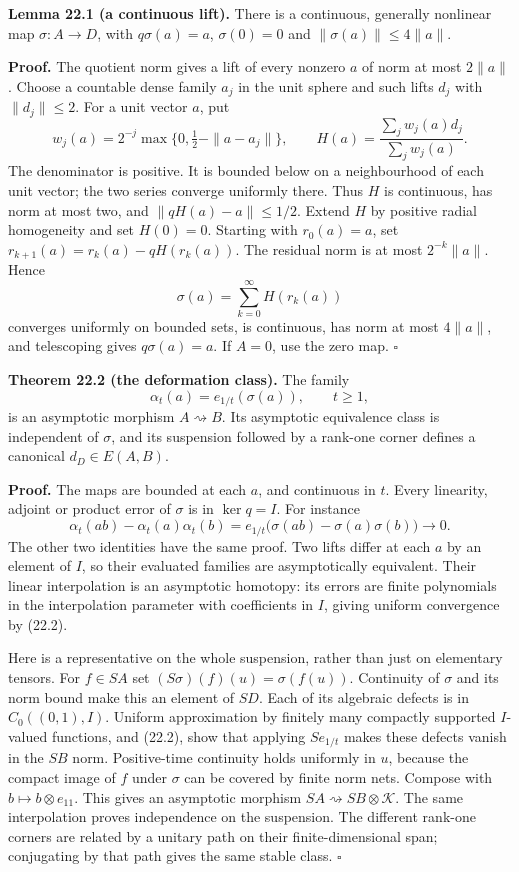 \documentclass[
  11pt,
]{article}
\begin{document}
\textbf{Lemma 22.1 (a continuous lift).} There is a continuous,
generally nonlinear map \(\sigma:A\to D\), with \(q\sigma(a)=a\),
\(\sigma(0)=0\) and \(\|\sigma(a)\|\leq4\|a\|\).

\textbf{Proof.} The quotient norm gives a lift of every nonzero \(a\) of
norm at most \(2\|a\|\). Choose a countable dense family \(a_j\) in the
unit sphere and such lifts \(d_j\) with \(\|d_j\|\leq2\). For a unit
vector \(a\), put \[
w_j(a)=2^{-j}\max\{0,\tfrac12-\|a-a_j\|\},\qquad
H(a)=\frac{\sum_jw_j(a)d_j}{\sum_jw_j(a)}.
\tag{22.3}
\] The denominator is positive. It is bounded below on a neighbourhood
of each unit vector; the two series converge uniformly there. Thus \(H\)
is continuous, has norm at most two, and \(\|qH(a)-a\|\leq1/2\). Extend
\(H\) by positive radial homogeneity and set \(H(0)=0\). Starting with
\(r_0(a)=a\), set \(r_{k+1}(a)=r_k(a)-qH(r_k(a))\). The residual norm is
at most \(2^{-k}\|a\|\). Hence \[
\sigma(a)=\sum_{k=0}^{\infty}H(r_k(a))
\tag{22.4}
\] converges uniformly on bounded sets, is continuous, has norm at most
\(4\|a\|\), and telescoping gives \(q\sigma(a)=a\). If \(A=0\), use the
zero map. \(\square\)

\textbf{Theorem 22.2 (the deformation class).} The family \[
\alpha_t(a)=e_{1/t}(\sigma(a)),\qquad t\geq1,
\tag{22.5}
\] is an asymptotic morphism \(A \rightsquigarrow B\). Its asymptotic
equivalence class is independent of \(\sigma\), and its suspension
followed by a rank-one corner defines a canonical \(d_D\in E(A,B)\).

\textbf{Proof.} The maps are bounded at each \(a\), and continuous in
\(t\). Every linearity, adjoint or product error of \(\sigma\) is in
\(\ker q=I\). For instance \[
\alpha_t(ab)-\alpha_t(a)\alpha_t(b)
=e_{1/t}\bigl(\sigma(ab)-\sigma(a)\sigma(b)\bigr)\longrightarrow0.
\tag{22.6}
\] The other two identities have the same proof. Two lifts differ at
each \(a\) by an element of \(I\), so their evaluated families are
asymptotically equivalent. Their linear interpolation is an asymptotic
homotopy: its errors are finite polynomials in the interpolation
parameter with coefficients in \(I\), giving uniform convergence by
(22.2).

Here is a representative on the whole suspension, rather than just on
elementary tensors. For \(f\in SA\) set
\((S\sigma)(f)(u)=\sigma(f(u))\). Continuity of \(\sigma\) and its norm
bound make this an element of \(SD\). Each of its algebraic defects is
in \(C_0((0,1),I)\). Uniform approximation by finitely many compactly
supported \(I\)-valued functions, and (22.2), show that applying
\(Se_{1/t}\) makes these defects vanish in the \(SB\) norm.
Positive-time continuity holds uniformly in \(u\), because the compact
image of \(f\) under \(\sigma\) can be covered by finite norm nets.
Compose with \(b\mapsto b\otimes e_{11}\). This gives an asymptotic
morphism \(SA \rightsquigarrow SB\otimes\mathcal K\). The same
interpolation proves independence on the suspension. The different
rank-one corners are related by a unitary path on their
finite-dimensional span; conjugating by that path gives the same stable
class. \(\square\)
\end{document}
